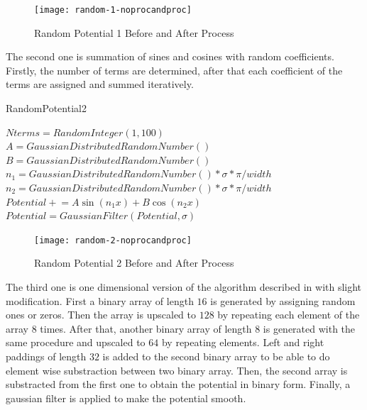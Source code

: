\documentclass[a4paper,times,hidelinks,12pt]{article}
\begin{document}
\graphicspath{{"../figs/potentials/"}}
\begin{figure}[H]
    \centering
        \texttt{[image: random-1-noprocandproc]}
\caption{Random Potential 1 Before and After Process}
\label{fig:random1_before_after}
\end{figure}



The second one is summation of sines and cosines with random coefficients. Firstly, the number of terms are determined, after that each coefficient of the terms are assigned and summed iteratively.

\begin{algorithm}[H]
    \caption{RandomPotential2}\label{euclid}
    \begin{algorithmic}[1]
        \State $ Nterms = RandomInteger(1, 100)$
        \State $A = GaussianDistributedRandomNumber()$
        \State $B = GaussianDistributedRandomNumber()$
        \State $n_1 = GaussianDistributedRandomNumber() * \sigma*\pi / width  $
        \State $n_2 = GaussianDistributedRandomNumber() * \sigma*\pi / width  $
        \State $Potential \mathrel{+}= A\sin(n_1 x) + B\cos(n_2 x)$
        \EndFor
        \State $Potential = GaussianFilter(Potential, \sigma)$ 
    \EndProcedure
    \end{algorithmic}
\label{alg:random_potential_1}
\end{algorithm}

\graphicspath{{"../figs/potentials/"}}
\begin{figure}[H]
    \centering
        \texttt{[image: random-2-noprocandproc]}
\caption{Random Potential 2 Before and After Process}
\label{fig:random2_before_after}
\end{figure}

The third one is one dimensional version of the algorithm described in \cite{mills2017deep} with slight modification. First a binary array of length $16$ is generated by assigning random ones or zeros. Then the array is upscaled to $128$ by repeating each element of the array $8$ times. After that, another binary array of length $8$ is generated with the same procedure and upscaled to $64$ by repeating elements. Left and right paddings of length $32$ is added to the second binary array to be able to do element wise substraction between two binary array. Then, the second array is substracted from the first one to obtain the potential in binary form. Finally, a gaussian filter is applied to make the potential smooth. 
\end{document}
